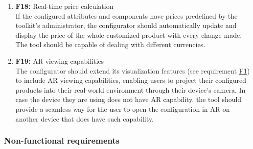 \begin{enumerate}
\item \textbf{F18:} Real-time price calculation
\vspace{2pt}
\\If the configured attributes and components have prices predefined by the toolkit's administrator, the configurator should automatically update and display the price of the whole customized product with every change made. The tool should be capable of dealing with different currencies.
\vspace{4pt}

\item \textbf{F19:} AR viewing capabilities
\vspace{2pt}
\\The configurator should extend its visualization features (see requirement \hyperref[itm:F1]{F1}) to include AR viewing capabilities, enabling users to project their configured products into their real-world environment through their device's camera. In case the device they are using does not have AR capability, the tool should provide a seamless way for the user to open the configuration in AR on another device that does have such capability.
\vspace{4pt}

\end{enumerate}


\subsubsection{Non-functional requirements}

